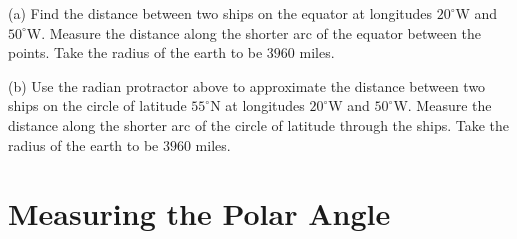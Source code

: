\documentclass{ximera}
\begin{document}
\begin{question}  \label{Q941F:Angles}
(a) Find the distance between two ships on the equator at longitudes $20^\circ$W and $50^\circ$W. Measure the distance along the shorter arc of the equator between the points. Take the radius of the earth to be $3960$ miles.

(b) Use the radian protractor above to approximate the distance between two ships on the circle of latitude $55^\circ$N at longitudes $20^\circ$W and $50^\circ$W. Measure the distance along the shorter arc of the circle of latitude through the ships.  Take the radius of the earth to be $3960$ miles.
\end{question}

















\section{Measuring the Polar Angle}



 
 
\end{document}
